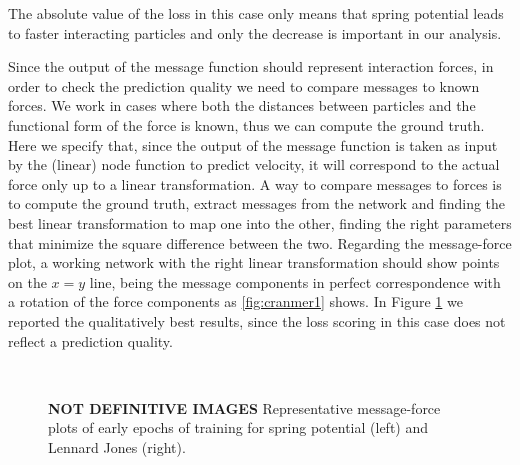 \documentclass[../../master_thesis_np.tex]{subfiles}
\begin{document}
The absolute value of the loss in this case only means that spring potential leads to faster interacting particles and only the decrease is important in our analysis.

Since the output of the message function should represent interaction forces, in order to check the prediction quality we need to compare messages to known forces.
We work in cases where both the distances between particles and the functional form of the force is known, thus we can compute the ground truth.
Here we specify that, since the output of the message function is taken as input by the (linear) node function to predict velocity, it will correspond to the actual force only up to a linear transformation.
A way to compare messages to forces is to compute the ground truth, extract messages from the network and finding the best linear transformation to map one into the other, finding the right parameters that minimize the square difference between the two.
Regarding the message-force plot, a working network with the right linear transformation should show points on the $x = y$ line, being the message components in perfect correspondence with a rotation of the force components as \ref{fig:cranmer1} shows.
In Figure \ref{fig:lincomb} we reported the qualitatively best results, since the loss scoring in this case does not reflect a prediction quality.

\begin{figure}[tp]
	\centering
	\\
	\caption{\textbf{NOT DEFINITIVE IMAGES} Representative message-force plots of early epochs of training for spring potential (left) and Lennard Jones (right).}
	\label{fig:lincomb}
\end{figure}
\end{document}
